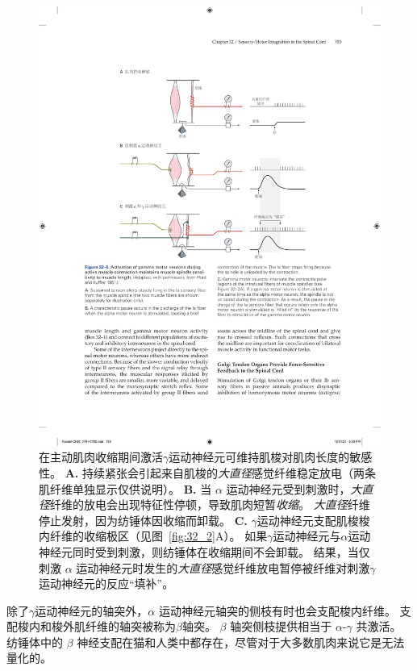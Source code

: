 \begin{figure}[htbp]
	\centering
	\includegraphics[width=0.92\linewidth]{chap32/fig_32_5}
	\caption{在主动肌肉收缩期间激活$ \gamma $运动神经元可维持肌梭对肌肉长度的敏感性\cite{hunt1951stretch}。
	\textbf{A.} 持续紧张会引起来自肌梭的\textit{大直径}感觉纤维稳定放电（两条肌纤维单独显示仅供说明）。
	\textbf{B.} 当 $ \alpha $ 运动神经元受到刺激时，\textit{大直径}纤维的放电会出现特征性停顿，导致肌肉短暂\textit{收缩}。
	\textit{大直径}纤维停止发射，因为纺锤体因收缩而卸载。
	\textbf{C.} $ \gamma $运动神经元支配肌梭梭内纤维的收缩极区（见图~\ref{fig:32_2}A）。
	如果$ \gamma $运动神经元与$ \alpha $运动神经元同时受到刺激，则纺锤体在收缩期间不会卸载。
	结果，当仅刺激 $ \alpha $ 运动神经元时发生的\textit{大直径}感觉纤维放电暂停被纤维对刺激$ \gamma $运动神经元的反应“填补”。}
	\label{fig:32_5}
\end{figure}


除了$ \gamma $运动神经元的轴突外，$ \alpha $ 运动神经元轴突的侧枝有时也会支配梭内纤维。
支配梭内和梭外肌纤维的轴突被称为$\beta$轴突。
$ \beta $ 轴突侧枝提供相当于 $ \alpha $-$ \gamma $ 共激活。
纺锤体中的 $ \beta $ 神经支配在猫和人类中都存在，尽管对于大多数肌肉来说它是无法量化的。


